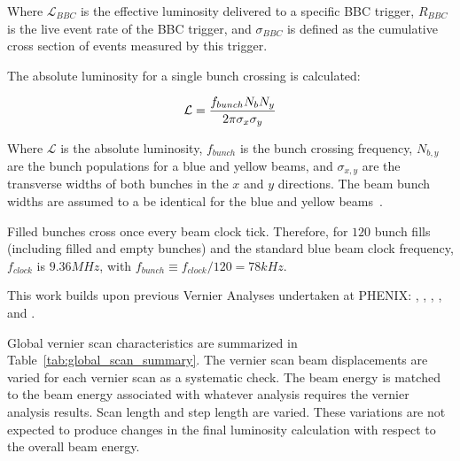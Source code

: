 {\noindent}Where $\mathcal{L}_{BBC}$ is the effective luminosity delivered to a
specific BBC trigger, $R_{BBC}$ is the live event rate of the BBC trigger, and
$\sigma_{BBC}$ is defined as the cumulative cross section of events measured by
this trigger.

{\noindent}The absolute luminosity for a single bunch crossing is calculated:

\begin{equation} 
\label{eq:lumi_one_bunch} 
\mathcal{L} = {f_{bunch}N_{b} N_{y}\over{2\pi\sigma_{x}\sigma_{y}}} 
\end{equation}

{\noindent}Where $\mathcal{L}$ is the absolute luminosity, $f_{bunch}$ is the
bunch crossing frequency, $N_{b,y}$ are the bunch populations for a blue and
yellow beams, and $\sigma_{x,y}$ are the transverse widths of both bunches in
the $x$ and $y$ directions. The beam bunch widths are assumed to a be identical
for the blue and yellow beams~\cite{AN888Datta2010}.

Filled bunches cross once every beam clock tick. Therefore, for $120$ bunch
fills (including filled and empty bunches) and the standard blue beam clock
frequency, $f_{clock}$ is $9.36 MHz$, with $f_{bunch} \equiv f_{clock} / 120 =
78 kHz$.

This work builds upon previous Vernier Analyses undertaken at PHENIX:
\cite{AN184Belikov2003}, \cite{an597Bazilevsky2007}, \cite{an688Bennett2008},
\cite{AN888Datta2010}, and \cite{Drees2009}.

Global vernier scan characteristics are summarized in
Table~\ref{tab:global_scan_summary}. The vernier scan beam displacements are
varied for each vernier scan as a systematic check. The beam energy is matched
to the beam energy associated with whatever analysis requires the vernier
analysis results. Scan length and step length are varied. These variations are
not expected to produce changes in the final luminosity calculation with respect
to the overall beam energy.

